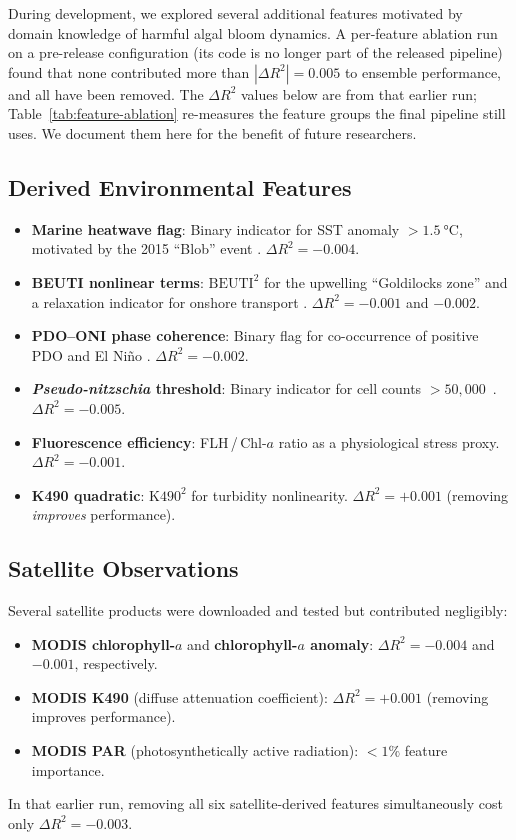 \documentclass[toxins,article,submit,moreauthors]{Definitions/mdpi}
\begin{document}
During development, we explored several additional features motivated by domain knowledge of harmful algal bloom dynamics. A per-feature ablation run on a pre-release configuration (its code is no longer part of the released pipeline) found that none contributed more than $|\Delta R^2| = 0.005$ to ensemble performance, and all have been removed. The $\Delta R^2$ values below are from that earlier run; Table~\ref{tab:feature-ablation} re-measures the feature groups the final pipeline still uses. We document them here for the benefit of future researchers.

\subsection*{Derived Environmental Features}

\begin{itemize}[nosep]
    \item \textbf{Marine heatwave flag}: Binary indicator for SST anomaly $> \SI{1.5}{\degreeCelsius}$, motivated by the 2015 ``Blob'' event \cite{Bond2015, McCabe2016}. $\Delta R^2 = -0.004$.
    \item \textbf{BEUTI nonlinear terms}: $\text{BEUTI}^2$ for the upwelling ``Goldilocks zone'' \cite{Trainer2020} and a relaxation indicator for onshore transport \cite{Trainer2002}. $\Delta R^2 = -0.001$ and $-0.002$.
    \item \textbf{PDO--ONI phase coherence}: Binary flag for co-occurrence of positive PDO and El Ni\~no \cite{McKibben2017}. $\Delta R^2 = -0.002$.
    \item \textbf{\textit{Pseudo-nitzschia} threshold}: Binary indicator for cell counts $> 50{,}000$~\si{\cellsperL}. $\Delta R^2 = -0.005$.
    \item \textbf{Fluorescence efficiency}: FLH\,/\,Chl-$a$ ratio as a physiological stress proxy. $\Delta R^2 = -0.001$.
    \item \textbf{K490 quadratic}: $\text{K490}^2$ for turbidity nonlinearity. $\Delta R^2 = +0.001$ (removing \textit{improves} performance).
\end{itemize}

\subsection*{Satellite Observations}

Several satellite products were downloaded and tested but contributed negligibly:
\begin{itemize}[nosep]
    \item \textbf{MODIS chlorophyll-$a$} and \textbf{chlorophyll-$a$ anomaly}: $\Delta R^2 = -0.004$ and $-0.001$, respectively.
    \item \textbf{MODIS K490} (diffuse attenuation coefficient): $\Delta R^2 = +0.001$ (removing improves performance).
    \item \textbf{MODIS PAR} (photosynthetically active radiation): $< 1\%$ feature importance.
\end{itemize}
In that earlier run, removing all six satellite-derived features simultaneously cost only $\Delta R^2 = -0.003$.
\end{document}
